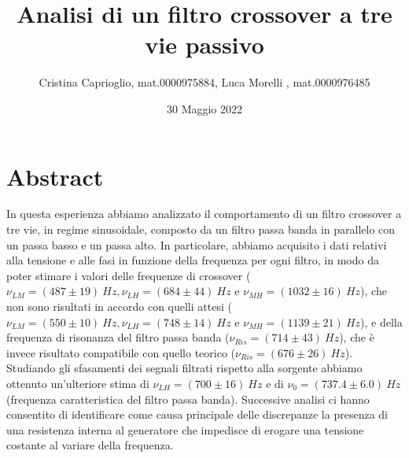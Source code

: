 \documentclass[]{article}
\title{Analisi di un filtro crossover a tre vie passivo}
\author{Cristina Caprioglio, mat.0000975884, Luca Morelli , mat.0000976485}
\date{30 Maggio 2022}
\begin{document}
\maketitle

\section{Abstract}
In questa esperienza abbiamo analizzato il comportamento di un filtro crossover a tre vie, in regime sinusoidale, composto da un filtro passa banda in parallelo con un passa basso e un passa alto. In particolare, abbiamo acquisito i dati relativi alla tensione e alle fasi in funzione della frequenza per ogni filtro, in modo da poter stimare i valori delle frequenze di crossover ($ \nu_{LM}=(487\pm19)\:Hz, \nu_{LH}=(684\pm44)\:Hz $ e $ \nu_{MH}=(1032\pm16)\:Hz $), che non sono risultati in accordo con quelli attesi ($ \nu_{LM}= (550 \pm 10) \:Hz, \nu_{LH}= (748
\pm 14 )\:Hz $ e $ \nu_{MH}= (1139\pm 21 )\:Hz $), e della frequenza di risonanza del filtro passa banda ($ \nu_{Ris}=(714\pm43)\: Hz$), che è invece risultato compatibile con quello teorico ($ \nu_{Ris}=(676\pm26)\: Hz$).
Studiando gli sfasamenti dei segnali filtrati rispetto alla sorgente abbiamo ottenuto un'ulteriore stima di $ \nu_{LH}=(700\pm16)\:Hz$ e di $ \nu_{0}=(737.4\pm6.0)\: Hz$ (frequenza caratteristica del filtro passa banda). Successive analisi ci hanno consentito di identificare come causa principale delle discrepanze la presenza di una resistenza interna al generatore che impedisce di erogare una tensione costante al variare della frequenza.
\end{document}
